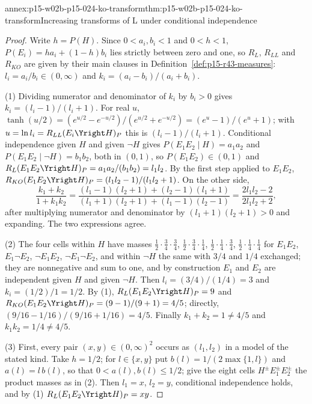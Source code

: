 \begin{annexitem}{annex:p15-w02b-p15-024-ko-transform}{thm:p15-w02b-p15-024-ko-transform}{Increasing transforms of L under conditional independence}
\begin{proof}
Write \(h=P(H)\). Since \(0<a_i,b_i<1\) and \(0<h<1\),
\(P(E_i)=ha_i+(1-h)b_i\) lies strictly between zero and one, so
\(R_L\), \(R_{LL}\) and \(R_{KO}\) are given by their main clauses in
Definition~\ref{def:p15-r43-measures}: \(l_i=a_i/b_i\in(0,\infty)\) and
\(k_i=(a_i-b_i)/(a_i+b_i)\).

(1) Dividing numerator and denominator of \(k_i\) by \(b_i>0\) gives
\(k_i=(l_i-1)/(l_i+1)\). For real \(u\),
\(\tanh(u/2)=(e^{u/2}-e^{-u/2})/(e^{u/2}+e^{-u/2})=(e^u-1)/(e^u+1)\);
with \(u=\ln l_i=R_{LL}(E_i\Yright H)_P\) this is \((l_i-1)/(l_i+1)\).
Conditional independence given \(H\) and given \(\neg H\) gives
\(P(E_1E_2\mid H)=a_1a_2\) and \(P(E_1E_2\mid\neg H)=b_1b_2\), both in
\((0,1)\), so \(P(E_1E_2)\in(0,1)\) and
\(R_L(E_1E_2\Yright H)_P=a_1a_2/(b_1b_2)=l_1l_2\). By the first step
applied to \(E_1E_2\),
\(R_{KO}(E_1E_2\Yright H)_P=(l_1l_2-1)/(l_1l_2+1)\). On the other side,
\[
 \frac{k_1+k_2}{1+k_1k_2}
 =\frac{(l_1-1)(l_2+1)+(l_2-1)(l_1+1)}{(l_1+1)(l_2+1)+(l_1-1)(l_2-1)}
 =\frac{2l_1l_2-2}{2l_1l_2+2},
\]
after multiplying numerator and denominator by \((l_1+1)(l_2+1)>0\)
and expanding. The two expressions agree.

(2) The four cells within \(H\) have masses
\(\tfrac12\cdot\tfrac34\cdot\tfrac34\), \(\tfrac12\cdot\tfrac34\cdot\tfrac14\),
\(\tfrac12\cdot\tfrac14\cdot\tfrac34\), \(\tfrac12\cdot\tfrac14\cdot\tfrac14\)
for \(E_1E_2\), \(E_1\neg E_2\), \(\neg E_1E_2\), \(\neg E_1\neg E_2\),
and within \(\neg H\) the same with \(3/4\) and \(1/4\) exchanged;
they are nonnegative and sum to one, and by construction \(E_1\) and
\(E_2\) are independent given \(H\) and given \(\neg H\). Then
\(l_i=(3/4)/(1/4)=3\) and \(k_i=(1/2)/1=1/2\). By (1),
\(R_L(E_1E_2\Yright H)_P=9\) and
\(R_{KO}(E_1E_2\Yright H)_P=(9-1)/(9+1)=4/5\); directly,
\((9/16-1/16)/(9/16+1/16)=4/5\). Finally \(k_1+k_2=1\neq4/5\) and
\(k_1k_2=1/4\neq4/5\).

(3) First, every pair \((x,y)\in(0,\infty)^2\) occurs as \((l_1,l_2)\)
in a model of the stated kind. Take \(h=1/2\); for \(l\in\{x,y\}\) put
\(b(l)=1/(2\max\{1,l\})\) and \(a(l)=l\,b(l)\), so that
\(0<a(l),b(l)\leq1/2\); give the eight cells
\(H^{\pm}E_1^{\pm}E_2^{\pm}\) the product masses as in (2). Then
\(l_1=x\), \(l_2=y\), conditional independence holds, and by (1)
\(R_L(E_1E_2\Yright H)_P=xy\).


\end{proof}
\end{annexitem}
